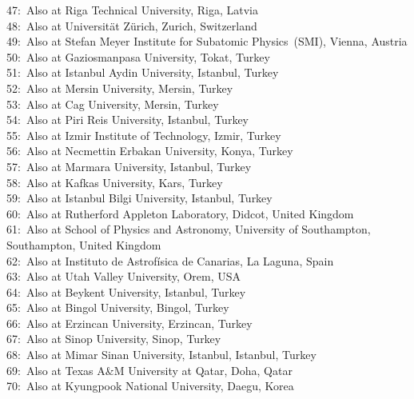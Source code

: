 47:~Also at Riga Technical University, Riga, Latvia\\
48:~Also at Universit\"{a}t Z\"{u}rich, Zurich, Switzerland\\
49:~Also at Stefan Meyer Institute for Subatomic Physics~(SMI), Vienna, Austria\\
50:~Also at Gaziosmanpasa University, Tokat, Turkey\\
51:~Also at Istanbul Aydin University, Istanbul, Turkey\\
52:~Also at Mersin University, Mersin, Turkey\\
53:~Also at Cag University, Mersin, Turkey\\
54:~Also at Piri Reis University, Istanbul, Turkey\\
55:~Also at Izmir Institute of Technology, Izmir, Turkey\\
56:~Also at Necmettin Erbakan University, Konya, Turkey\\
57:~Also at Marmara University, Istanbul, Turkey\\
58:~Also at Kafkas University, Kars, Turkey\\
59:~Also at Istanbul Bilgi University, Istanbul, Turkey\\
60:~Also at Rutherford Appleton Laboratory, Didcot, United Kingdom\\
61:~Also at School of Physics and Astronomy, University of Southampton, Southampton, United Kingdom\\
62:~Also at Instituto de Astrof\'{i}sica de Canarias, La Laguna, Spain\\
63:~Also at Utah Valley University, Orem, USA\\
64:~Also at Beykent University, Istanbul, Turkey\\
65:~Also at Bingol University, Bingol, Turkey\\
66:~Also at Erzincan University, Erzincan, Turkey\\
67:~Also at Sinop University, Sinop, Turkey\\
68:~Also at Mimar Sinan University, Istanbul, Istanbul, Turkey\\
69:~Also at Texas A\&M University at Qatar, Doha, Qatar\\
70:~Also at Kyungpook National University, Daegu, Korea\\

